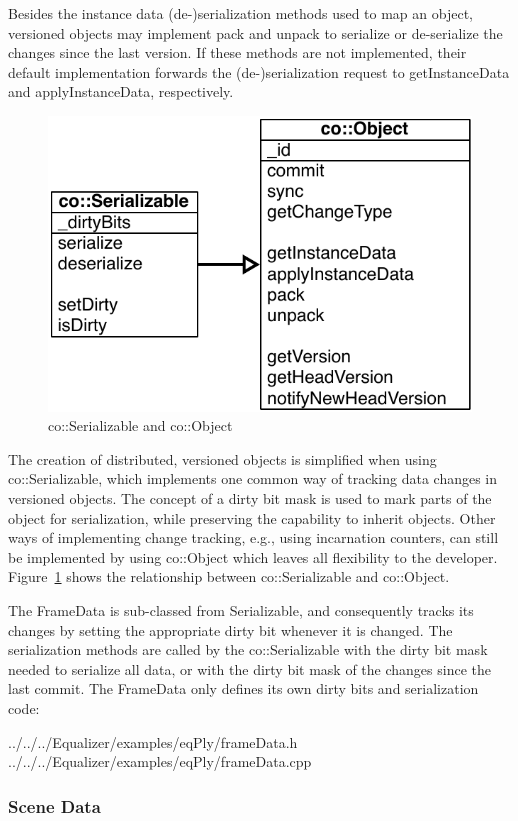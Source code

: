 \documentclass[10pt,a4]{scrartcl}
\newcommand{\fig}[1]{Figure~\ref{#1}}
\begin{document}
Besides the instance data (de-)serialization methods used to map an
object, versioned objects may implement \textsf{pack} and
\textsf{unpack} to serialize or de-serialize the changes since the last
version. If these methods are not implemented, their default
implementation forwards the (de-)serialization request to
\textsf{getInstanceData} and \textsf{applyInstanceData}, respectively.

\begin{figure}
  \includegraphics[width=.382\textwidth]{images/umlObject.pdf}
  {\caption{\label{fUMLObject}co::Serializable and co::Object}}
\end{figure}
The creation of distributed, versioned objects is simplified when using
\textsf{co::Serializable}, which implements one common way of tracking
data changes in versioned objects. The concept of a dirty bit mask is used to
mark parts of the object for serialization, while preserving the capability to
inherit objects. Other ways of implementing change tracking, e.g., using
incarnation counters, can still be implemented by using \textsf{co::Object}
which leaves all flexibility to the developer. \fig{fUMLObject} shows the
relationship between \textsf{co::Serializable} and \textsf{co::Object}.

The \textsf{FrameData} is sub-classed from \textsf{Serializable}, and
consequently tracks its changes by setting the appropriate dirty bit whenever it
is changed. The serialization methods are called by the
\textsf{co::Serializable} with the dirty bit mask needed to serialize
all data, or with the dirty bit mask of the changes since the last
\textsf{commit}. The \textsf{FrameData} only defines its own dirty bits and
serialization code:

{\footnotesize
  {../../../Equalizer/examples/eqPly/frameData.h}}
{\footnotesize
  {../../../Equalizer/examples/eqPly/frameData.cpp}}


\subsubsection{\label{sSceneData}Scene Data}
\end{document}

